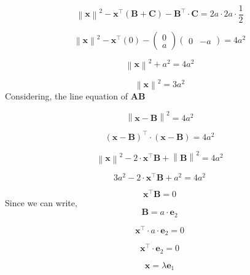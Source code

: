 \documentclass[journal,12pt,twocolumn]{IEEEtran}
\providecommand{\norm}[1]{\left\lVert#1\right\rVert}
\let\vec\mathbf
\newcommand{\myvec}[1]{\ensuremath{\begin{pmatrix}#1\end{pmatrix}}}
\providecommand{\brak}[1]{\ensuremath{\left(#1\right)}}
\begin{document}
 \begin{equation}  
\norm{\vec{x}}^2 - \vec{x}^\top\brak{\vec{B}+\vec{C}} - \vec{B}^\top \cdot \vec{C} = 2a \cdot 2a \cdot \frac{1}{2}
 \end{equation}

  \begin{equation}  
\norm{\vec{x}}^2 - \vec{x}^\top\brak{0} -\myvec{0 \\ a} \myvec{0 & -a}  = 4a^2
 \end{equation}

\begin{equation}
\norm{\vec{x}}^2 + a^2 = 4a^2
\end{equation}

\begin{equation}
\norm{\vec{x}}^2 = 3a^2
\label{eq-1}
\end{equation}
Considering, the line equation of $\vec{AB}$

\begin{equation}
\norm{\vec{x}-\vec{B}}^2 = 4a^2
\end{equation}

\begin{equation}
\brak{\vec{x} -\vec{B}}^{\top} \cdot \brak{\vec{x}-\vec{B}} = 4a^2
\end{equation}

\begin{equation}
\norm{\vec{x}}^2-2\cdot \vec{x}^\top \vec{B} + \norm{\vec{B}}^2 = 4a^2
\end{equation}

\begin{equation}
3a^2 - 2\cdot \vec{x}^\top \vec{B} + a^2 = 4a^2
\end{equation}

\begin{equation}
\vec{x}^\top \vec{B} = 0
\end{equation}
\noindent Since we can write, \begin{equation}
\vec{B} = a \cdot \vec{e}_2
\end{equation}

\begin{equation}
\vec{x}^\top \cdot a \cdot \vec{e}_2 = 0
\end{equation}

\begin{equation}
\vec{x}^\top \cdot \vec{e}_2 = 0
\end{equation}

\begin{equation}
\vec{x} = \lambda \vec{e}_1
\end{equation}
\end{document}
